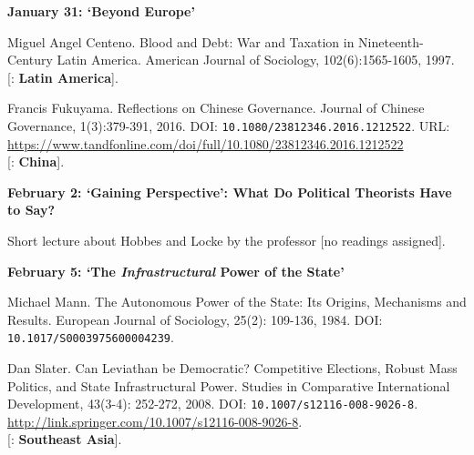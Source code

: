 \documentclass[letterpaper]{article}
\renewenvironment{itemize}{
  \begin{list}{}{
    \setlength{\leftmargin}{1.5em}
  }
}{
  \end{list}
}
\begin{document}
\begin{enumerate}
\begin{itemize}
	\item {\bf January 31: `Beyond Europe'}
		\begin{itemize} 
			\item[$\bullet$] Miguel Angel Centeno. Blood and Debt: War and Taxation in Nineteenth-Century Latin America. American Journal of Sociology, 102(6):1565-1605, 1997.\\
			{\color{brown}[\faGlobe: {\bf Latin America}].}

			\item[$\bullet$] Francis Fukuyama. Reflections on Chinese Governance. Journal of Chinese Governance, 1(3):379-391, 2016. DOI: \texttt{10.1080/23812346.2016.1212522}. URL: \url{https://www.tandfonline.com/doi/full/10.1080/23812346.2016.1212522}\\
			{\color{brown}[\faGlobe: {\bf China}].}

		\end{itemize}

	\item {\bf  February 2: `Gaining Perspective': What Do Political Theorists Have to Say?}
		\begin{itemize} 
			\item[$\bullet$] Short lecture about Hobbes and Locke by the professor [no readings assigned].
		\end{itemize}


	\item {\bf February 5: `The \emph{Infrastructural} Power of the State'}
		\begin{itemize}
			\item[$\bullet$] Michael Mann. The Autonomous Power of the State: Its Origins, Mechanisms and Results. European Journal of Sociology, 25(2): 109-136, 1984. DOI: \texttt{10.1017/S0003975600004239}.
			\item[$\bullet$] Dan Slater. Can Leviathan be Democratic? Competitive Elections, Robust Mass Politics, and State Infrastructural Power. Studies in Comparative International Development, 43(3-4): 252-272, 2008. DOI: \texttt{10.1007/s12116-008-9026-8}. \url{http://link.springer.com/10.1007/s12116-008-9026-8}.\\
			{\color{brown}[\faGlobe: {\bf Southeast Asia}].}

		\end{itemize}
	\end{itemize}



 


\end{enumerate}
\end{document}
